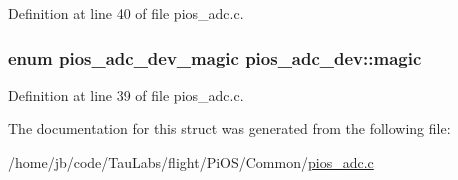 \-Definition at line 40 of file pios\-\_\-adc.\-c.

\hypertarget{structpios__adc__dev_ab066aa96f4656e2fbac6a1a9edc593fc}{
\subsubsection[{magic}]{\setlength{\rightskip}{0pt plus 5cm}enum {\bf pios\-\_\-adc\-\_\-dev\-\_\-magic} {\bf pios\-\_\-adc\-\_\-dev\-::magic}}}\label{structpios__adc__dev_ab066aa96f4656e2fbac6a1a9edc593fc}


\-Definition at line 39 of file pios\-\_\-adc.\-c.



\-The documentation for this struct was generated from the following file\-:\begin{DoxyCompactItemize}
\item 
/home/jb/code/\-Tau\-Labs/flight/\-Pi\-O\-S/\-Common/\hyperlink{pios__adc_8c}{pios\-\_\-adc.\-c}\end{DoxyCompactItemize}
